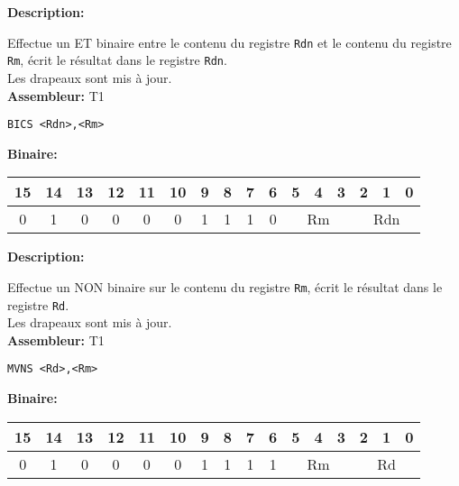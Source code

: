 
\textbf{Description: }

Effectue un ET binaire entre le contenu du registre \texttt{Rdn} et le contenu du registre \texttt{Rm}, écrit le résultat dans le registre \texttt{Rdn}.\\
Les drapeaux sont mis à jour.\\

\textbf{Assembleur:} T1

\begin{lstlisting}
BICS <Rdn>,<Rm>
\end{lstlisting}

\textbf{Binaire:}\\

\begin{tabular}{| c c c c c c c c c c c c c c c c |}
\hline
15 & 14 & 13 & 12 & 11 & 10 & \multicolumn{1}{|c}{9} & 8 & 7 & 6 & \multicolumn{1}{|c}{5} & 4 & 3 & \multicolumn{1}{|c}{2} & 1 & 0 \\
\hline
0 & 1 & 0 & 0 & 0 & 0 & \multicolumn{1}{|c}{1} & 1 & 1 & 0 & \multicolumn{3}{|c}{Rm} & \multicolumn{3}{|c|}{Rdn} \\
\hline
\end{tabular}



\textbf{Description: }

Effectue un NON binaire sur le contenu du registre \texttt{Rm}, écrit le résultat dans le registre \texttt{Rd}.\\
Les drapeaux sont mis à jour.\\

\textbf{Assembleur:} T1

\begin{lstlisting}
MVNS <Rd>,<Rm>
\end{lstlisting}

\textbf{Binaire:}\\

\begin{tabular}{| c c c c c c c c c c c c c c c c |}
\hline
15 & 14 & 13 & 12 & 11 & 10 & \multicolumn{1}{|c}{9} & 8 & 7 & 6 & \multicolumn{1}{|c}{5} & 4 & 3 & \multicolumn{1}{|c}{2} & 1 & 0 \\
\hline
0 & 1 & 0 & 0 & 0 & 0 & \multicolumn{1}{|c}{1} & 1 & 1 & 1 & \multicolumn{3}{|c}{Rm} & \multicolumn{3}{|c|}{Rd} \\
\hline
\end{tabular}


